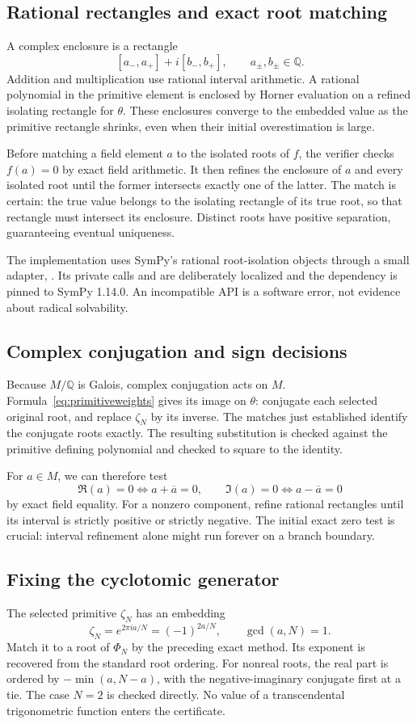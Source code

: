 \documentclass[11pt,letterpaper]{article}
\theoremstyle{definition}\newtheorem{definition}[theorem]{Definition}
\theoremstyle{remark}\newtheorem{remark}[theorem]{Remark}
\newcommand{\Q}{\mathbb Q}\newcommand{\C}{\mathbb C}\newcommand{\Z}{\mathbb Z}
\newcommand{\code}[1]{\texttt{\detokenize{#1}}}
\begin{document}
\subsection{Rational rectangles and exact root matching}
A complex enclosure is a rectangle
\[
 [a_-,a_+]+i[b_-,b_+],\qquad a_\pm,b_\pm\in\Q.
\]
Addition and multiplication use rational interval arithmetic. A rational polynomial in the primitive element is enclosed by Horner evaluation on a refined isolating rectangle for $\theta$. These enclosures converge to the embedded value as the primitive rectangle shrinks, even when their initial overestimation is large.

Before matching a field element $a$ to the isolated roots of $f$, the verifier checks $f(a)=0$ by exact field arithmetic. It then refines the enclosure of $a$ and every isolated root until the former intersects exactly one of the latter. The match is certain: the true value belongs to the isolating rectangle of its true root, so that rectangle must intersect its enclosure. Distinct roots have positive separation, guaranteeing eventual uniqueness.

The implementation uses SymPy's rational root-isolation objects through a small adapter, \code{RootBox}. Its private calls \code{CRootOf._get_interval()} and \code{refine_size()} are deliberately localized and the dependency is pinned to SymPy 1.14.0. An incompatible API is a software error, not evidence about radical solvability.

\subsection{Complex conjugation and sign decisions}
Because $M/\Q$ is Galois, complex conjugation acts on $M$. Formula~\eqref{eq:primitiveweights} gives its image on $\theta$: conjugate each selected original root, and replace $\zeta_N$ by its inverse. The matches just established identify the conjugate roots exactly. The resulting substitution is checked against the primitive defining polynomial and checked to square to the identity.

For $a\in M$, we can therefore test
\[
 \Re(a)=0\iff a+\overline a=0,\qquad
 \Im(a)=0\iff a-\overline a=0
\]
by exact field equality. For a nonzero component, refine rational rectangles until its interval is strictly positive or strictly negative. The initial exact zero test is crucial: interval refinement alone might run forever on a branch boundary.

\subsection{Fixing the cyclotomic generator}
The selected primitive $\zeta_N$ has an embedding
\[
 \zeta_N=e^{2\pi i a/N}=(-1)^{2a/N},\qquad \gcd(a,N)=1.
\]
Match it to a root of $\Phi_N$ by the preceding exact method. Its exponent is recovered from the standard root ordering. For nonreal roots, the real part is ordered by $-\min(a,N-a)$, with the negative-imaginary conjugate first at a tie. The case $N=2$ is checked directly. No value of a transcendental trigonometric function enters the certificate.
\end{document}
